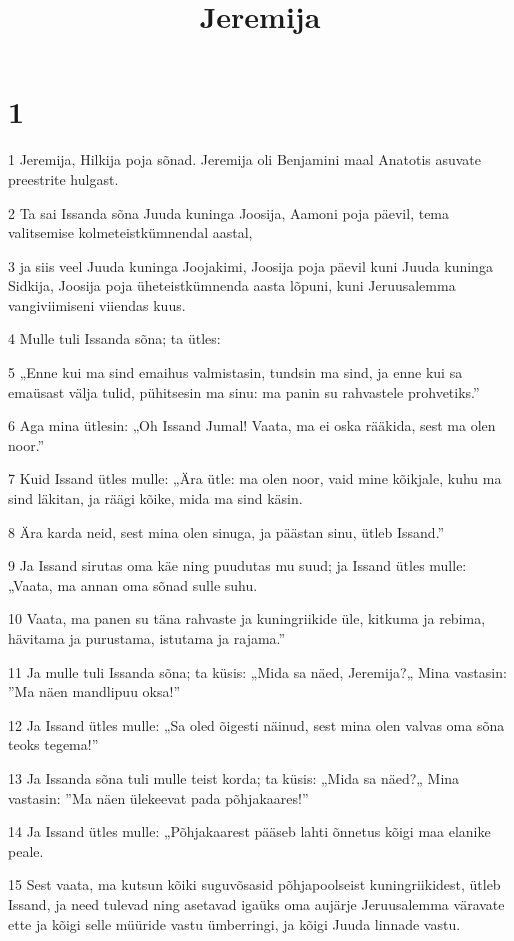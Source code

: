 

\title{Jeremija}

\chapter{1}

\par 1 Jeremija, Hilkija poja sõnad. Jeremija oli Benjamini maal Anatotis asuvate preestrite hulgast.
\par 2 Ta sai Issanda sõna Juuda kuninga Joosija, Aamoni poja päevil, tema valitsemise kolmeteistkümnendal aastal,
\par 3 ja siis veel Juuda kuninga Joojakimi, Joosija poja päevil kuni Juuda kuninga Sidkija, Joosija poja üheteistkümnenda aasta lõpuni, kuni Jeruusalemma vangiviimiseni viiendas kuus.
\par 4 Mulle tuli Issanda sõna; ta ütles:
\par 5 „Enne kui ma sind emaihus valmistasin, tundsin ma sind, ja enne kui sa emaüsast välja tulid, pühitsesin ma sinu: ma panin su rahvastele prohvetiks.”
\par 6 Aga mina ütlesin: „Oh Issand Jumal! Vaata, ma ei oska rääkida, sest ma olen noor.”
\par 7 Kuid Issand ütles mulle: „Ära ütle: ma olen noor, vaid mine kõikjale, kuhu ma sind läkitan, ja räägi kõike, mida ma sind käsin.
\par 8 Ära karda neid, sest mina olen sinuga, ja päästan sinu, ütleb Issand.”
\par 9 Ja Issand sirutas oma käe ning puudutas mu suud; ja Issand ütles mulle: „Vaata, ma annan oma sõnad sulle suhu.
\par 10 Vaata, ma panen su täna rahvaste ja kuningriikide üle, kitkuma ja rebima, hävitama ja purustama, istutama ja rajama.”
\par 11 Ja mulle tuli Issanda sõna; ta küsis: „Mida sa näed, Jeremija?„ Mina vastasin: ”Ma näen mandlipuu oksa!”
\par 12 Ja Issand ütles mulle: „Sa oled õigesti näinud, sest mina olen valvas oma sõna teoks tegema!”
\par 13 Ja Issanda sõna tuli mulle teist korda; ta küsis: „Mida sa näed?„ Mina vastasin: ”Ma näen ülekeevat pada põhjakaares!”
\par 14 Ja Issand ütles mulle: „Põhjakaarest pääseb lahti õnnetus kõigi maa elanike peale.
\par 15 Sest vaata, ma kutsun kõiki suguvõsasid põhjapoolseist kuningriikidest, ütleb Issand, ja need tulevad ning asetavad igaüks oma aujärje Jeruusalemma väravate ette ja kõigi selle müüride vastu ümberringi, ja kõigi Juuda linnade vastu.
